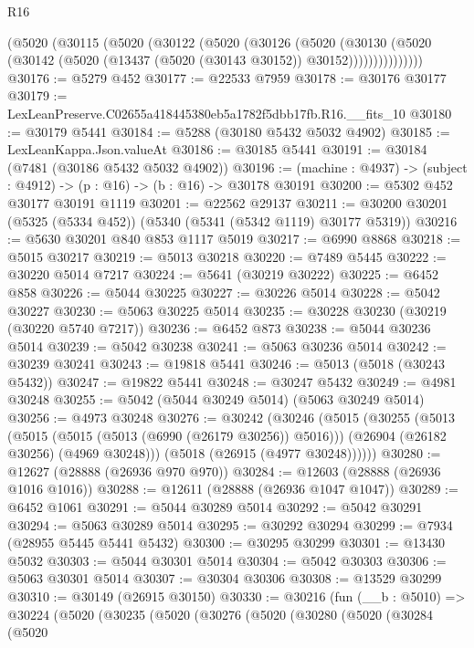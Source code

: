 \begin{lexlean}{R16}
\begin{coremodule}
          (@5020
            (@30115
              (@5020
                (@30122
                  (@5020
                    (@30126
                      (@5020
                        (@30130
                          (@5020
                            (@30142 (@5020 (@13437 (@5020 (@30143 @30152)) @30152)))))))))))))))
@30176 := @5279 @452
@30177 := @22533 @7959
@30178 := @30176 @30177
@30179 := LexLeanPreserve.C02655a418445380eb5a1782f5dbb17fb.R16.__fits_10
@30180 := @30179 @5441
@30184 := @5288 (@30180 @5432 @5032 @4902)
@30185 := LexLeanKappa.Json.valueAt
@30186 := @30185 @5441
@30191 := @30184 (@7481 (@30186 @5432 @5032 @4902))
@30196 := (machine : @4937) -> (subject : @4912) -> (p : @16) -> (b : @16) -> @30178 @30191
@30200 := @5302 @452 @30177 @30191 @1119
@30201 := @22562 @29137
@30211 := @30200 @30201 (@5325 (@5334 @452)) (@5340 (@5341 (@5342 @1119) @30177 @5319))
@30216 := @5630 @30201 @840 @853 @1117 @5019
@30217 := @6990 @8868
@30218 := @5015 @30217
@30219 := @5013 @30218
@30220 := @7489 @5445
@30222 := @30220 @5014 @7217
@30224 := @5641 (@30219 @30222)
@30225 := @6452 @858
@30226 := @5044 @30225
@30227 := @30226 @5014
@30228 := @5042 @30227
@30230 := @5063 @30225 @5014
@30235 := @30228 @30230 (@30219 (@30220 @5740 @7217))
@30236 := @6452 @873
@30238 := @5044 @30236 @5014
@30239 := @5042 @30238
@30241 := @5063 @30236 @5014
@30242 := @30239 @30241
@30243 := @19818 @5441
@30246 := @5013 (@5018 (@30243 @5432))
@30247 := @19822 @5441
@30248 := @30247 @5432
@30249 := @4981 @30248
@30255 := @5042 (@5044 @30249 @5014) (@5063 @30249 @5014)
@30256 := @4973 @30248
@30276 := @30242
    (@30246
      (@5015
        (@30255
          (@5013
            (@5015 (@5015 (@5013 (@6990 (@26179 @30256)) @5016)))
            (@26904 (@26182 @30256) (@4969 @30248)))
          (@5018 (@26915 (@4977 @30248))))))
@30280 := @12627 (@28888 (@26936 @970 @970))
@30284 := @12603 (@28888 (@26936 @1016 @1016))
@30288 := @12611 (@28888 (@26936 @1047 @1047))
@30289 := @6452 @1061
@30291 := @5044 @30289 @5014
@30292 := @5042 @30291
@30294 := @5063 @30289 @5014
@30295 := @30292 @30294
@30299 := @7934 (@28955 @5445 @5441 @5432)
@30300 := @30295 @30299
@30301 := @13430 @5032
@30303 := @5044 @30301 @5014
@30304 := @5042 @30303
@30306 := @5063 @30301 @5014
@30307 := @30304 @30306
@30308 := @13529 @30299
@30310 := @30149 (@26915 @30150)
@30330 := @30216
    (fun (__b : @5010) =>
    @30224
      (@5020
        (@30235
          (@5020
            (@30276
              (@5020
                (@30280
                  (@5020
                    (@30284
                      (@5020

\end{coremodule}
\end{lexlean}
